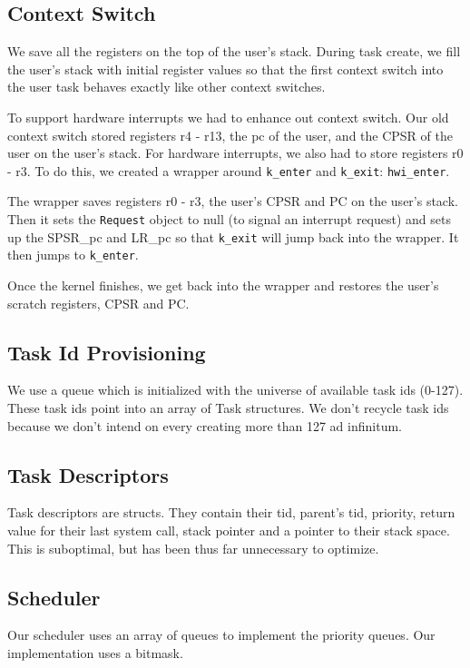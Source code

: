 \documentclass[letterpaper]{article}
\begin{document}
\subsection{Context Switch}

We save all the registers on the top of the user's stack. During task create, we fill the user's stack with initial
register values so that the first context switch into the user task behaves exactly like other context switches.

To support hardware interrupts we had to enhance out context switch. Our old context switch stored registers r4 - r13, the pc of the user, and the CPSR of the user on the user's stack. For hardware interrupts, we also had to store registers r0 - r3. To do this, we created a wrapper around {\tt k\_enter} and {\tt k\_exit}: {\tt hwi\_enter}.

The wrapper saves registers r0 - r3, the user's CPSR and PC on the user's stack. Then it sets the {\tt Request} object to null (to signal an interrupt request) and sets up the SPSR\_pc and LR\_pc so that {\tt k\_exit} will jump back into the wrapper. It then jumps to {\tt k\_enter}.

Once the kernel finishes, we get back into the wrapper and restores the user's scratch registers, CPSR and PC.

\subsection{Task Id Provisioning}
We use a queue which is initialized with the universe of available task ids (0-127). These task ids point into an array
of Task structures. We don't recycle task ids because we don't intend on every creating more than 127 ad infinitum.

\subsection{Task Descriptors}
Task descriptors are structs. They contain their tid, parent's tid, priority, return value for their last system call, stack pointer and a pointer to their stack space. This is suboptimal, but has been thus far unnecessary to optimize.

\subsection{Scheduler}

Our scheduler uses an array of queues to implement the priority queues. Our implementation uses a bitmask.
\end{document}
